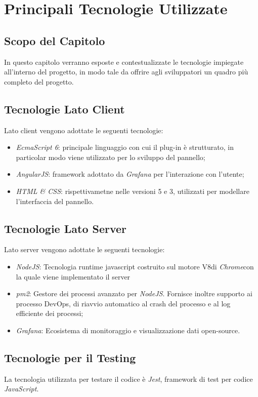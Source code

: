 \section{Principali Tecnologie Utilizzate}\label{tecnologie}
\subsection{Scopo del Capitolo}
In questo capitolo verranno esposte e contestualizzate le tecnologie impiegate all'interno del progetto, in modo tale da offrire agli sviluppatori un quadro più completo del progetto.

\subsection{Tecnologie Lato Client}\label{clientTec}
Lato client vengono adottate le seguenti tecnologie:
\begin{itemize}
	\item \textit{EcmaScript 6}: principale linguaggio con cui il plug-in è strutturato, in particolar modo viene utilizzato per lo sviluppo del pannello;
	\item \textit{AngularJS}: framework adottato da \textit{Grafana} per l'interazione con l'utente;
	\item \textit{HTML \& CSS}: rispettivametne nelle versioni 5 e 3, utilizzati per modellare l'interfaccia del pannello.
\end{itemize}

\subsection{Tecnologie Lato Server}\label{serverTec}
Lato server vengono adottate le seguenti tecnologie:
\begin{itemize}
	\item \textit{NodeJS}: Tecnologia runtime javascript costruito sul motore V8\glossario di \textit{Chrome}\glossario con la quale viene implementato il server 
	\item \textit{pm2}: Gestore dei processi avanzato per \textit{NodeJS}. Fornisce inoltre supporto ai processo DevOps\glossario , di riavvio automatico al crash del processo e al log efficiente dei processi;
	\item \textit{Grafana}: Ecosistema di monitoraggio e visualizzazione dati open-source.
\end{itemize}

\subsection{Tecnologie per il Testing}\label{testTec}
La tecnologia utilizzata per testare il codice è \textit{Jest}, framework di test per codice \textit{JavaScript}.